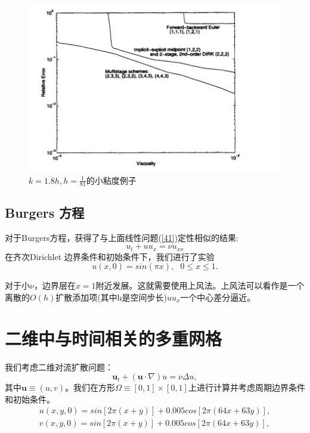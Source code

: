 \documentclass[12pt,a4paper]{article}
\numberwithin{equation}{section}
\begin{document}
\begin{figure}[H]
\includegraphics[width=15cm]{./figures/5.png}
\caption{$k=1.8h,h=\frac{1}{81}$的小粘度例子}
\centering
\label{figures5}
\end{figure}

\subsection{Burgers 方程}
对于Burgers方程，获得了与上面线性问题(\ref{41})定性相似的结果:
\begin{equation}
u_{t}+uu_{x}=\nu u_{xx}
\end{equation}
在齐次Dirichlet 边界条件和初始条件下，我们进行了实验
\begin{equation*}
u(x,0)=sin(\pi x),~~~0\le x\le 1.
\end{equation*}

对于小$\nu $，边界层在$x =1$附近发展。这就需要使用上风法。上风法可以看作是一个离散的$O(h)$扩散添加项(其中h是空间步长)$uu_{x}$一个中心差分逼近。

\section{二维中与时间相关的多重网格}

我们考虑二维对流扩散问题：
\begin{equation}
\mathbf{u}_{t}+(\mathbf{u}\cdot\nabla)u=\nu \Delta u,
\label{51}
\end{equation}
其中$\mathbf{u}\equiv (u,v)$。我们在方形$\varOmega\equiv [0,1]\times [0,1]$上进行计算并考虑周期边界条件和初始条件。
\begin{gather*}
u(x,y,0)=sin[2\pi (x+y)]+0.005cos[2\pi (64x+63y)],\\
v(x,y,0)=sin[2\pi (x+y)]+0.005cos[2\pi (64x+63y)],
\end{gather*}
\end{document}
